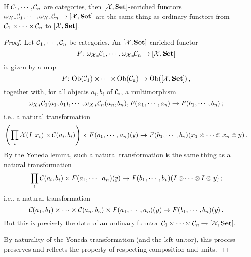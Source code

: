 \documentclass{report}[11pt]
\begin{document}
\begin{proposition}
  If ${\mathcal{C}}_1,\cdots,{\mathcal{C}}_n$ are categories, then $[\mathcal X,{\normalfont\textbf{Set}}]$-enriched functors ${\omega_\mathcal X}_*{\mathcal{C}}_1,\cdots,{\omega_\mathcal X}_*{\mathcal{C}}_n\to[\mathcal X,{\normalfont\textbf{Set}}]$ are the same thing as ordinary functors from ${\mathcal{C}}_1\times\cdots\times{\mathcal{C}}_n$ to $[\mathcal X,{\normalfont\textbf{Set}}]$.
\end{proposition}
\begin{proof}
  Let ${\mathcal{C}}_1,\cdots,{\mathcal{C}}_n$ be categories.  
  An $[\mathcal X,{\normalfont\textbf{Set}}]$-enriched functor
  \[
    F \colon {\omega_\mathcal X}_*{\mathcal{C}}_1,\cdots,{\omega_\mathcal X}_*{\mathcal{C}}_n \to [\mathcal X,{\normalfont\textbf{Set}}]
    \]
  is given by a map
  \[
    F\colon \text{Ob}({\mathcal{C}}_1)\times\cdots\times\text{Ob}({\mathcal{C}}_n) \to \text{Ob}([\mathcal X,{\normalfont\textbf{Set}}])\,,
    \]
  together with, for all objects $a_i,b_i$ of ${\mathcal{C}}_i$, a multimorphism
  \[
    {\omega_X}_*{\mathcal{C}}_1(a_1,b_1),\cdots,{\omega_X}_*{\mathcal{C}}_n(a_n,b_n),F(a_1,\cdots,a_n)\to F(b_1,\cdots,b_n)\,;
    \]
  i.e., a natural transformation
  \[
    \left(\prod_i \mathcal X(I,x_i)\times{\mathcal{C}}(a_i,b_i)\right) \times F(a_1,\cdots,a_n)(y) \to F(b_1,\cdots,b_n)(x_1\otimes\cdots\otimes x_n\otimes y)\,.
    \]
  By the Yoneda lemma, such a natural transformation is the same thing as a natural transformation
  \[
    \prod_i {\mathcal{C}}(a_i,b_i) \times F(a_1,\cdots,a_n)(y) \to F(b_1,\cdots,b_n)(I \otimes \cdots \otimes I \otimes y)\,;
    \]
  i.e., a natural transformation
  \[
    {\mathcal{C}}(a_1,b_1)\times\cdots\times{\mathcal{C}}(a_n,b_n) \times F(a_1,\cdots,a_n)(y) \to F(b_1,\cdots,b_n)(y)\,.
    \]
  But this is precisely the data of an ordinary functor ${\mathcal{C}}_1\times\cdots\times{\mathcal{C}}_n \to [\mathcal X,{\normalfont\textbf{Set}}]$.

  By naturality of the Yoneda transformation (and the left unitor), this process preserves and reflects the property of respecting composition and units.
  \label{PropOmegaProperty}
\end{proof}
\end{document}
